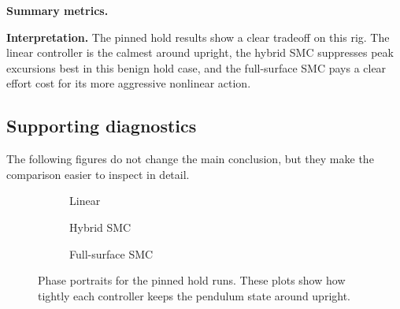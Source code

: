 \noindent\textbf{Summary metrics.}


\noindent\textbf{Interpretation.} The pinned hold results show a clear tradeoff on this rig. The linear controller is the calmest around upright, the hybrid SMC suppresses peak excursions best in this benign hold case, and the full-surface SMC pays a clear effort cost for its more aggressive nonlinear action.

\subsection*{Supporting diagnostics}
The following figures do not change the main conclusion, but they make the comparison easier to inspect in detail.

\begin{figure}[htbp]
  \centering
  \begin{subfigure}[t]{0.32\linewidth}
    \centering
    \caption{Linear}
  \end{subfigure}\hfill
  \begin{subfigure}[t]{0.32\linewidth}
    \centering
    \caption{Hybrid SMC}
  \end{subfigure}\hfill
  \begin{subfigure}[t]{0.32\linewidth}
    \centering
    \caption{Full-surface SMC}
  \end{subfigure}
  \caption{Phase portraits for the pinned hold runs. These plots show how tightly each controller keeps the pendulum state around upright.}
  \label{fig:hold_phase_support}
\end{figure}

